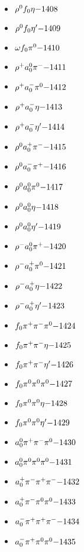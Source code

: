 \begin{multicols}{3}
\begin{itemize}
 \item $ \rho^{0} f_{0} \eta \hfill{-1408}$
 \item $ \rho^{0} f_{0} {\eta^{\prime}} \hfill{-1409}$
 \item $ \omega f_{0} \pi^{0} \hfill{-1410}$
 \item $ \rho^{+} a_{0}^{0} \pi^{-} \hfill{-1411}$
 \item $ \rho^{+} a_{0}^{-} \pi^{0} \hfill{-1412}$
 \item $ \rho^{+} a_{0}^{-} \eta \hfill{-1413}$
 \item $ \rho^{+} a_{0}^{-} {\eta^{\prime}} \hfill{-1414}$
 \item $ \rho^{0} a_{0}^{+} \pi^{-} \hfill{-1415}$
 \item $ \rho^{0} a_{0}^{-} \pi^{+} \hfill{-1416}$
 \item $ \rho^{0} a_{0}^{0} \pi^{0} \hfill{-1417}$
 \item $ \rho^{0} a_{0}^{0} \eta \hfill{-1418}$
 \item $ \rho^{0} a_{0}^{0} {\eta^{\prime}} \hfill{-1419}$
 \item $ \rho^{-} a_{0}^{0} \pi^{+} \hfill{-1420}$
 \item $ \rho^{-} a_{0}^{+} \pi^{0} \hfill{-1421}$
 \item $ \rho^{-} a_{0}^{+} \eta \hfill{-1422}$
 \item $ \rho^{-} a_{0}^{+} {\eta^{\prime}} \hfill{-1423}$
 \item $ f_{0} \pi^{+} \pi^{-} \pi^{0} \hfill{-1424}$
 \item $ f_{0} \pi^{+} \pi^{-} \eta \hfill{-1425}$
 \item $ f_{0} \pi^{+} \pi^{-} {\eta^{\prime}} \hfill{-1426}$
 \item $ f_{0} \pi^{0} \pi^{0} \pi^{0} \hfill{-1427}$
 \item $ f_{0} \pi^{0} \pi^{0} \eta \hfill{-1428}$
 \item $ f_{0} \pi^{0} \pi^{0} {\eta^{\prime}} \hfill{-1429}$
 \item $ a_{0}^{0} \pi^{+} \pi^{-} \pi^{0} \hfill{-1430}$
 \item $ a_{0}^{0} \pi^{0} \pi^{0} \pi^{0} \hfill{-1431}$
 \item $ a_{0}^{+} \pi^{-} \pi^{+} \pi^{-} \hfill{-1432}$
 \item $ a_{0}^{+} \pi^{-} \pi^{0} \pi^{0} \hfill{-1433}$
 \item $ a_{0}^{-} \pi^{+} \pi^{+} \pi^{-} \hfill{-1434}$
 \item $ a_{0}^{-} \pi^{+} \pi^{0} \pi^{0} \hfill{-1435}$

\end{itemize}
\end{multicols}
